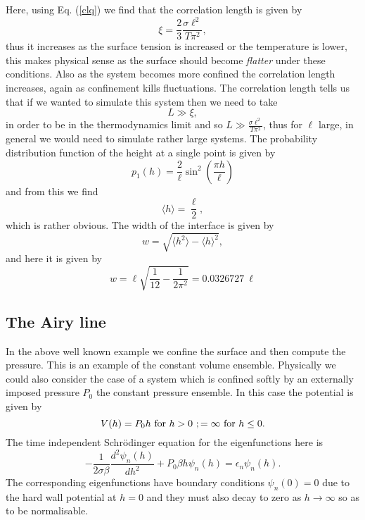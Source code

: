 Here, using Eq. (\ref{clq}) we find that  the correlation length is given by
\begin{equation}
\xi = \frac{2}{3}\frac{\sigma \ell^2}{T\pi^2},\label{corel}
\end{equation}
thus it increases as the surface tension is increased or the temperature is lower, this makes physical sense as the surface should become {\em flatter} under these conditions. Also as the system becomes more confined the correlation length increases, again as  confinement  
kills fluctuations. The correlation length tells us that if we wanted to simulate this system then we need to take
\begin{equation}
L\gg \xi ,
\end{equation}
in order to be in the thermodynamics limit and so $L \gg \frac{\sigma \ell^2}{T\pi^2}$, thus for 
$\ell$ large, in general we would need to simulate rather large systems.
The probability distribution function of the height at a single point is given by
\begin{equation}
p_1(h) =\frac{2}{\ell}\sin^2(\frac{\pi h}{\ell})
\end{equation}
and from this we find 
\begin{equation}
\langle h\rangle = \frac{\ell}{2},  
\end{equation}
which is rather obvious. The width of the interface is given by 
\begin{equation}
w=\sqrt{\langle h^2\rangle - \langle h\rangle^2},
\end{equation}
and here it is given by
\begin{equation}
w= \ell\sqrt{\frac{1}{12}-\frac{1}{2\pi^2}}= 0.0326727\  \ell
\end{equation}

\subsection{The Airy line}
In the  above well known example we confine the surface and then compute the pressure. This is an example of the constant volume ensemble. Physically we could also consider the case of a system which is confined softly by an externally imposed pressure $P_0$ the constant pressure ensemble. In this case the potential is given by
\begin{equation}
V(h) = P_0 h \ {\rm for }\ h>0\ ; =\infty \ {\rm for}\ h\leq 0. 
\end{equation}
The time independent Schr\"odinger equation for the eigenfunctions here is
\begin{equation}
-\frac{1}{2\sigma\beta}\frac{d^2 \psi_n(h)}{dh^2} + P_0\beta h \psi_n(h) = \epsilon_n\psi_n(h).
\end{equation}
The corresponding eigenfunctions have boundary conditions $\psi_n(0)=0$ due to the hard wall potential at $h=0$ and they must also decay to zero as $h\to \infty$ so as to be normalisable.

